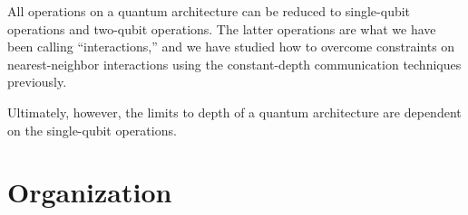 All operations on a quantum architecture can be reduced to single-qubit operations and two-qubit operations.
The latter operations are what we have been calling ``interactions,'' and we have studied how to overcome
constraints on nearest-neighbor interactions using the constant-depth communication techniques previously.

Ultimately, however, the limits to depth of a quantum architecture are dependent on the single-qubit operations.

\section{Organization}